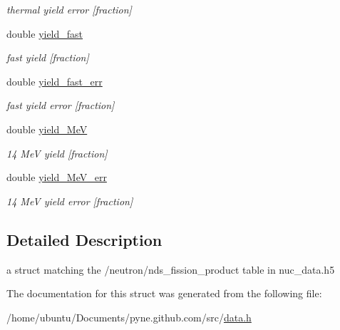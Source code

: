 \begin{DoxyCompactItemize}
\begin{DoxyCompactList}\small\item\em thermal yield error \mbox{[}fraction\mbox{]} \end{DoxyCompactList}\item 
double \hyperlink{structpyne_1_1ndsfpy_ae890b10d182d771d0837b24818040a25}{yield\+\_\+fast}\hypertarget{structpyne_1_1ndsfpy_ae890b10d182d771d0837b24818040a25}{}\label{structpyne_1_1ndsfpy_ae890b10d182d771d0837b24818040a25}

\begin{DoxyCompactList}\small\item\em fast yield \mbox{[}fraction\mbox{]} \end{DoxyCompactList}\item 
double \hyperlink{structpyne_1_1ndsfpy_a0e2478bc6cbf2317861727a88cb8370b}{yield\+\_\+fast\+\_\+err}\hypertarget{structpyne_1_1ndsfpy_a0e2478bc6cbf2317861727a88cb8370b}{}\label{structpyne_1_1ndsfpy_a0e2478bc6cbf2317861727a88cb8370b}

\begin{DoxyCompactList}\small\item\em fast yield error \mbox{[}fraction\mbox{]} \end{DoxyCompactList}\item 
double \hyperlink{structpyne_1_1ndsfpy_a5e67e99b97b5ca511ca39c6dcd4b186e}{yield\+\_\+MeV}\hypertarget{structpyne_1_1ndsfpy_a5e67e99b97b5ca511ca39c6dcd4b186e}{}\label{structpyne_1_1ndsfpy_a5e67e99b97b5ca511ca39c6dcd4b186e}

\begin{DoxyCompactList}\small\item\em 14 MeV yield \mbox{[}fraction\mbox{]} \end{DoxyCompactList}\item 
double \hyperlink{structpyne_1_1ndsfpy_a1d24f4162fe242108b8032f76171d7e5}{yield\+\_\+Me\+V\+\_\+err}\hypertarget{structpyne_1_1ndsfpy_a1d24f4162fe242108b8032f76171d7e5}{}\label{structpyne_1_1ndsfpy_a1d24f4162fe242108b8032f76171d7e5}

\begin{DoxyCompactList}\small\item\em 14 MeV yield error \mbox{[}fraction\mbox{]} \end{DoxyCompactList}\end{DoxyCompactItemize}


\subsection{Detailed Description}
a struct matching the \textquotesingle{}/neutron/nds\+\_\+fission\+\_\+product\textquotesingle{} table in nuc\+\_\+data.\+h5 

The documentation for this struct was generated from the following file\+:\begin{DoxyCompactItemize}
\item 
/home/ubuntu/\+Documents/pyne.\+github.\+com/src/\hyperlink{data_8h}{data.\+h}\end{DoxyCompactItemize}
